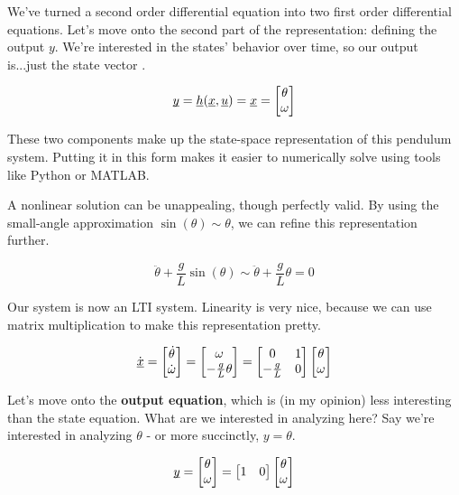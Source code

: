 \documentclass{report}
\begin{document}
\begin{onehalfspacing}
\begin{flushleft}
We've turned a second order differential equation into two first order differential equations. Let's move onto the second part of the representation: defining the output \(y\). We're interested in the states' behavior over time, so our output is...just the state vector .

\[\underbar{\(y\)} = \underbar{\(h\)}(\underbar{\(x\)}, \underbar{\(u\)}) = \underbar{\(x\)} = \begin{bmatrix}
    \theta \\
    \omega  \end{bmatrix}\]

These two components make up the state-space representation of this pendulum system. Putting it in this form makes it easier to numerically solve using tools like Python or MATLAB.

\medskip

A nonlinear solution can be unappealing, though perfectly valid. By using the small-angle approximation \(\sin(\theta) \sim \theta\), we can refine this representation further.

\[\ddot{\theta} + \frac{g}{L} \sin(\theta) \sim \ddot{\theta} + \frac{g}{L} \theta = 0\]

Our system is now an LTI system. Linearity is very nice, because we can use matrix multiplication to make this representation pretty.

\vspace{-0.1in}
\[\dot{\underbar{\(x\)}} = \begin{bmatrix}
    \dot{\theta} \\
    \dot{\omega}  \end{bmatrix} = \begin{bmatrix}
    \omega \\
    -\frac{g}{L} \theta
\end{bmatrix} = \begin{bmatrix}
    0 & 1\\
    -\frac{g}{L} & 0
\end{bmatrix} \begin{bmatrix}
    \theta \\
    \omega  \end{bmatrix}\]

Let's move onto the \textbf{output equation}, which is (in my opinion) less interesting than the state equation. What are we interested in analyzing here? Say we're interested in analyzing \(\theta\) - or more succinctly, \(y = \theta\).

\vspace{-0.1in}
\[\underbar{\(y\)} = \begin{bmatrix}
    \theta \\
    \omega  \end{bmatrix} = \begin{bmatrix}
        1 & 0
    \end{bmatrix} \begin{bmatrix}
        \theta \\
        \omega  \end{bmatrix}\]


\end{flushleft}
\end{onehalfspacing}
\end{document}
